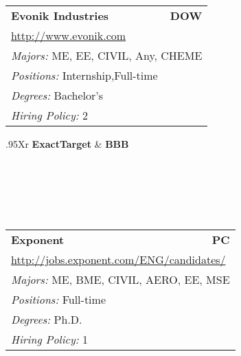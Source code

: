 \documentclass[twoside]{article}
\begin{document}
\begin{center}
\begin{multicols}{3}
\begin{FlushLeft}
\begin{minipage}{\columnwidth}
\end{minipage}
 
\begin{minipage}{\columnwidth}\begin{tabularx}{.95\columnwidth}{Xr}
                 {\Large\bf Evonik Industries} & {\Large\bf DOW}\\
    \multicolumn{2}{p{.95\columnwidth}}{\url{http://www.evonik.com}}\\
    \multicolumn{2}{p{.95\columnwidth}}{\emph{Majors:} ME, EE, CIVIL, Any, CHEME}\\
    \multicolumn{2}{p{.95\columnwidth}}{\emph{Positions:} Internship,Full-time}\\
    \multicolumn{2}{p{.95\columnwidth}}{\emph{Degrees:} Bachelor's}\\
    \multicolumn{2}{p{.95\columnwidth}}{\emph{Hiring Policy:} 2}\\
    \end{tabularx}
    
\end{minipage}
 
\begin{minipage}{\columnwidth}\begin{tabularx}{.95\columnwidth}{Xr}
                 {\Large\bf ExactTarget} & {\Large\bf BBB}\\
    \\
    \\
    \\
    \\
    \\
    \end{tabularx}
    
\end{minipage}
 
\begin{minipage}{\columnwidth}\begin{tabularx}{.95\columnwidth}{Xr}
                 {\Large\bf Exponent} & {\Large\bf PC}\\
    \multicolumn{2}{p{.95\columnwidth}}{\url{http://jobs.exponent.com/ENG/candidates/}}\\
    \multicolumn{2}{p{.95\columnwidth}}{\emph{Majors:} ME, BME, CIVIL, AERO, EE, MSE}\\
    \multicolumn{2}{p{.95\columnwidth}}{\emph{Positions:} Full-time}\\
    \multicolumn{2}{p{.95\columnwidth}}{\emph{Degrees:} Ph.D.}\\
    \multicolumn{2}{p{.95\columnwidth}}{\emph{Hiring Policy:} 1}\\
    \end{tabularx}
    

\end{minipage}
\end{FlushLeft}
\end{multicols}
\end{center}
\end{document}

